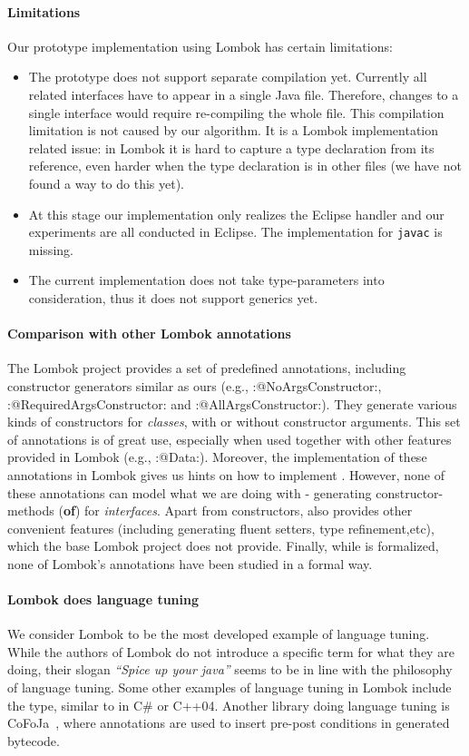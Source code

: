 \paragraph{Limitations}
Our prototype implementation using Lombok has certain limitations:
\begin{itemize}
\item The prototype does not support separate compilation yet. Currently all
  related interfaces have to appear in a single Java file. Therefore, changes to
  a single interface would require re-compiling the whole file. This compilation
  limitation is not caused by our algorithm. It is a Lombok implementation related
  issue: in Lombok it is hard to capture a type declaration from its reference,
  even harder when the type declaration is in other files (we have not found a
  way to do this yet).
\item At this stage our implementation only realizes the Eclipse handler and our
  experiments are all conducted in Eclipse. The implementation for
  \texttt{javac} is missing.
\item The current implementation does not take type-parameters into
  consideration, thus it does not support generics yet.
\end{itemize}

\paragraph{Comparison with other Lombok annotations}
The Lombok project provides a set of predefined annotations, including constructor
generators similar as ours (e.g., \Q:@NoArgsConstructor:,
\Q:@RequiredArgsConstructor: and \Q:@AllArgsConstructor:). They
generate various kinds of constructors for \emph{classes}, with or without
constructor arguments. This set of annotations is of great use, especially when
used together with other features provided in Lombok (e.g.,
\Q:@Data:). Moreover, the implementation of these annotations in Lombok
gives us hints on how to implement \mixin. However, none of these annotations
can model what we are doing with \mixin - generating constructor-methods
(\textbf{of}) for \emph{interfaces}. Apart from constructors, \mixin also
provides other convenient features (including generating fluent setters, type
refinement,etc), which the base Lombok project does not provide.
Finally, while \mixin is formalized, none of Lombok's annotations have been
studied in a formal way.

\paragraph{Lombok does language tuning}
We consider Lombok to be the most developed example of language
tuning.  While the authors of Lombok do not introduce a specific term
for what they are doing, their slogan \emph{``Spice up your java''}
seems to be in line with the philosophy of language tuning. Some
other examples of language tuning in Lombok include the \Q@val@ type,
similar to \Q@auto@ in C\# or C++04.  Another library doing language
tuning is CoFoJa~\cite{cofoja}, where annotations are used to insert
pre-post conditions in generated bytecode.


